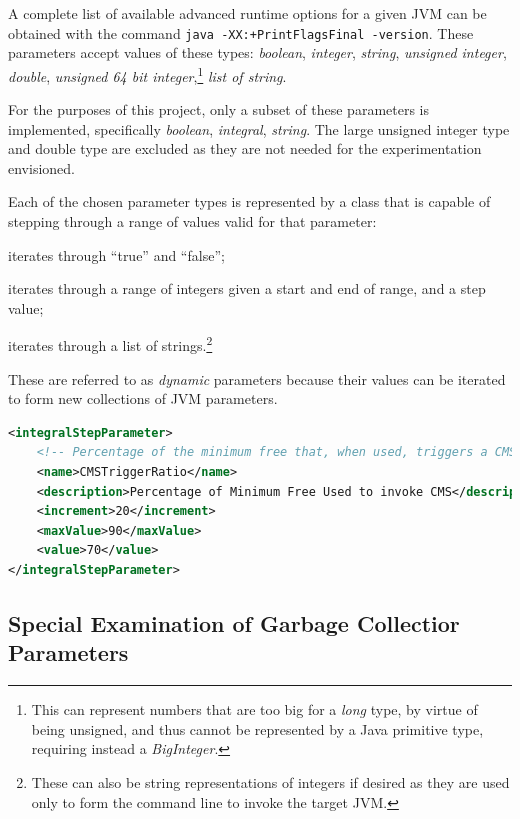 \documentclass[]{final_report}
\begin{document}
A complete list of available advanced runtime options for a given JVM can be obtained with the command \lstinline{java -XX:+PrintFlagsFinal -version}. These parameters accept values of these types: \textit{boolean}, \textit{integer}, \textit{string}, \textit{unsigned integer}, \textit{double}, \textit{unsigned 64 bit integer},\footnote{This can represent numbers that are too big for a \textit{long} type, by virtue of being unsigned, and thus cannot be represented by a Java primitive type, requiring instead a \textit{BigInteger}.} \textit{list of string}.

For the purposes of this project, only a subset of these parameters is implemented, specifically \textit{boolean}, \textit{integral}, \textit{string}. The large unsigned integer type and double type are excluded as they are not needed for the experimentation envisioned.

Each of the chosen parameter types is represented by a class that is capable of stepping through a range of values valid for that parameter:

\begin{description}[style=nextline]
\item[BoolParameter]  iterates through ``true'' and ``false'';
\item[IntegralStepParameter] iterates through a range of integers given a start and end of range, and a step value;
\item[StringListParameter] iterates through a list of strings.\footnote{These can also be string representations of integers if desired as they are used only to form the command line to invoke the target JVM.}
\end{description}

These are referred to as \textit{dynamic} parameters because their values can be iterated to form new collections of JVM parameters.

\begin{lstlisting}[language=xml,caption=Example of Specifying an \textit{IntegralStepParameter}]
<integralStepParameter>
    <!-- Percentage of the minimum free that, when used, triggers a CMS collection, 70 or 90 % -->
    <name>CMSTriggerRatio</name>
    <description>Percentage of Minimum Free Used to invoke CMS</description>
    <increment>20</increment>
    <maxValue>90</maxValue>
    <value>70</value>
</integralStepParameter>
\end{lstlisting}

\subsection{Special Examination of Garbage Collectior Parameters \label{special_garbage}}
\end{document}
